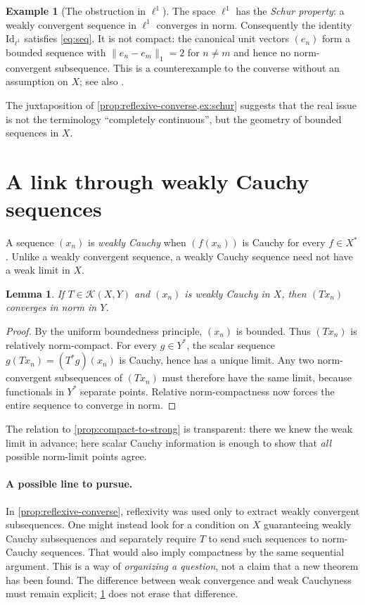 \documentclass[11pt,a4paper]{article}
\newtheorem{lemma}[lemma]{Lemma}
\theoremstyle{definition}
\newtheorem{example}[example]{Example}
\theoremstyle{remark}
\newcommand{\cK}{\mathcal{K}}
\newcommand{\ellone}{\ell^{1}}
\begin{document}
\begin{example}[The obstruction in $\ell^1$]\label{ex:schur}
The space $\ellone$ has the \emph{Schur property}: a weakly convergent
sequence in $\ellone$ converges in norm.  Consequently the identity
$\mathrm{Id}_{\ellone}$ satisfies \eqref{eq:seq}.  It is not compact:
the canonical unit vectors $(e_n)$ form a bounded sequence with
$\|e_n-e_m\|_1=2$ for $n\neq m$ and hence no norm-convergent
subsequence.  This is a counterexample to the converse without an
assumption on $X$; see also \cite{eom}.
\end{example}

The juxtaposition of \cref{prop:reflexive-converse,ex:schur} suggests
that the real issue is not the terminology ``completely continuous'',
but the geometry of bounded sequences in $X$.

\section{A link through weakly Cauchy sequences}\label{sec:cauchy}

A sequence $(x_n)$ is \emph{weakly Cauchy} when $(f(x_n))$ is Cauchy for
every $f\in X^*$.  Unlike a weakly convergent sequence, a weakly Cauchy
sequence need not have a weak limit in $X$.

\begin{lemma}\label{lem:weak-cauchy}
If $T\in\cK(X,Y)$ and $(x_n)$ is weakly Cauchy in $X$, then
$(Tx_n)$ converges in norm in $Y$.
\end{lemma}

\begin{proof}
By the uniform boundedness principle, $(x_n)$ is bounded.  Thus
$(Tx_n)$ is relatively norm-compact.  For every $g\in Y^*$, the scalar
sequence $g(Tx_n)=(T^*g)(x_n)$ is Cauchy, hence has a unique limit.
Any two norm-convergent subsequences of $(Tx_n)$ must therefore have
the same limit, because functionals in $Y^*$ separate points.  Relative
norm-compactness now forces the entire sequence to converge in norm.
\end{proof}

The relation to \cref{prop:compact-to-strong} is transparent: there we
knew the weak limit in advance; here scalar Cauchy information is enough
to show that \emph{all} possible norm-limit points agree.

\paragraph{A possible line to pursue.}\label{par:possible-line}
In \cref{prop:reflexive-converse}, reflexivity was used only to extract
weakly convergent subsequences.  One might instead look for a condition
on $X$ guaranteeing weakly Cauchy subsequences and separately require
$T$ to send such sequences to norm-Cauchy sequences.  That would also
imply compactness by the same sequential argument.  This is a way of
\emph{organizing a question}, not a claim that a new theorem has been
found.  The difference between weak convergence and weak Cauchyness
must remain explicit; \cref{ex:schur} does not erase that difference.
\end{document}
